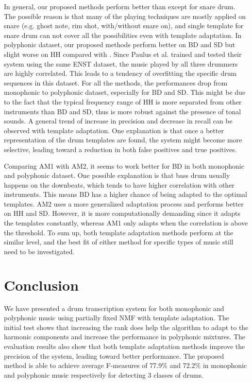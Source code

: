 \documentclass{article}
\begin{document}
In general, our proposed methods perform better than \cite{gillet_transcription_2008} except for snare drum. The possible reason is that many of the playing techniques are mostly applied on snare (e.g. ghost note, rim shot, with/without snare on), and single template for snare drum can not cover all the possibilities even with template adaptation. In polyphonic dataset, our proposed methods perform better on BD and SD but slight worse on HH compared with \cite{Paulus2009a}. Since Paulus et al.\cite{Paulus2009a} trained and tested their system using the same ENST dataset, the music played by all three drummers are highly correlated. This leads to a tendency of overfitting the specific drum sequences in this dataset. For all the methods, the performances drop from monophonic to polyphonic dataset, especially for BD and SD. This might be due to the fact that the typical frequency range of HH is more separated from other instruments than BD and SD, thus is more robust against the presence of tonal sounds. A general trend of increase in precision and decrease in recall can be observed with template adaptation. One explanation is that once a better representation of the drum templates are found, the system might become more selective, leading toward a reduction in both false positives and true positives. 

Comparing AM1 with AM2, it seems to work better for BD in both monophonic and polyphonic dataset. One possible explanation is that bass drum usually happens on the downbeats, which tends to have higher correlation with other instruments. This means BD has a higher chance of being adapted to the optimal templates. AM2 uses a more generalized adaptation process and performs better on HH and SD. However, it is more computationally demanding since it adapts the templates constantly, whereas AM1 only adapts when the correlation is above the threshold. To sum up, both template adaptation methods perform at the similar level, and the best fit of either method for specific types of music still need to be investigated. 

\section{Conclusion}\label{sec:Conclusion}
We have presented a drum transcription system for both monophonic and polyphonic music using partially fixed NMF with template adaptation. The initial test shows that increasing the rank does help the algorithm to adapt to the harmonic components and increase the performance in polyphonic mixtures. The evaluation results also show that both template adaptation methods improve the precision of the system, leading toward better performance. The proposed method is able to achieve average F-measures of 77.9\% and 72.2\% in monophonic and polyphonic music respectively for detecting 3 classes of drums. 
\end{document}
